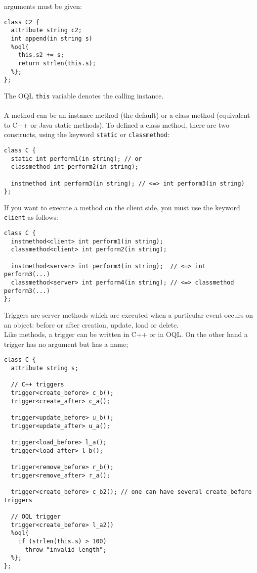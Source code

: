 arguments must be given:
\vspace{-0.2cm}
\begin{verbatim}
class C2 {
  attribute string c2;
  int append(in string s)
  %oql{
    this.s2 += s;
    return strlen(this.s);
  %};
};
\end{verbatim}
The OQL \texttt{this} variable denotes the calling instance.
\\
\\
A method can be an instance method (the default) or a class method (equivalent
to C++ or Java static methods). To defined a class method, there are
two constructs, using the keyword \texttt{static} or \texttt{classmethod}:
\vspace{-0.2cm}
\begin{verbatim}
class C {
  static int perform1(in string); // or
  classmethod int perform2(in string);

  instmethod int perform3(in string); // <=> int perform3(in string)
};
\end{verbatim}
If you want to execute a method on the client side, you must
use the keyword \texttt{client} as follows:
\vspace{-0.2cm}
\begin{verbatim}
class C {
  instmethod<client> int perform1(in string);
  classmethod<client> int perform2(in string);

  instmethod<server> int perform3(in string);  // <=> int perform3(...)
  classmethod<server> int perform4(in string); // <=> classmethod perform3(...)
};
\end{verbatim}

Triggers are server methods which are executed when a particular
event occurs on an object: before or after creation, update, load or delete.
\\
Like methods, a trigger can be written in C++ or in OQL. On the other
hand a trigger has no argument but has a name;
\vspace{-0.2cm}
\begin{verbatim}
class C {
  attribute string s;

  // C++ triggers
  trigger<create_before> c_b();
  trigger<create_after> c_a();

  trigger<update_before> u_b();
  trigger<update_after> u_a();

  trigger<load_before> l_a();
  trigger<load_after> l_b();

  trigger<remove_before> r_b();
  trigger<remove_after> r_a();

  trigger<create_before> c_b2(); // one can have several create_before triggers

  // OQL trigger
  trigger<create_before> l_a2()
  %oql{
    if (strlen(this.s) > 100)
      throw "invalid length";
  %};
};
\end{verbatim}


